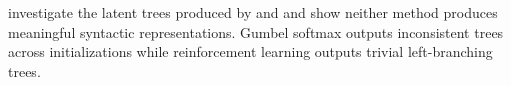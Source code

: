 




\textcite{williams_18} investigate the latent trees produced by \textcite{yogatama_17} and \textcite{choi_18} and show neither method produces meaningful syntactic representations. Gumbel softmax outputs inconsistent trees across initializations while reinforcement learning outputs trivial left-branching trees.


